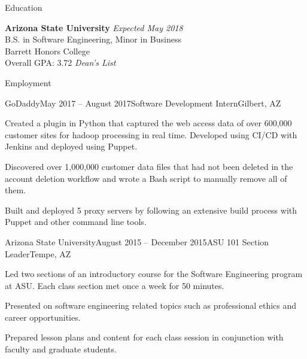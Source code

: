 \documentclass{resume} %
\begin{document}

\begin{rSection}{Education}

{\bf Arizona State University} \hfill {\em Expected May 2018} \\
B.S. in Software Engineering, Minor in Business \\
Barrett Honors College \smallskip \\
Overall GPA: 3.72 \textit{Dean's List}

\end{rSection}


\begin{rSection}{Employment}

\begin{rSubsection}{GoDaddy}{May 2017 -- August 2017}{Software Development Intern}{Gilbert, AZ}
\item Created a plugin in Python that captured the web access data of over 600,000 customer sites for hadoop processing in real time. Developed using CI/CD with Jenkins and deployed using Puppet.
\item Discovered over 1,000,000 customer data files that had not been deleted in the account deletion workflow and wrote a Bash script to manually remove all of them.
\item Built and deployed 5 proxy servers by following an extensive build process with Puppet and other command line tools.
\end{rSubsection}

\begin{rSubsection}{Arizona State University}{August 2015 -- December 2015}{ASU 101 Section Leader}{Tempe, AZ}
\item Led two sections of an introductory course for the Software Engineering program at ASU. Each class section met once a week for 50 minutes.
\item Presented on software engineering related topics such as professional ethics and career opportunities.
\item Prepared lesson plans and content for each class session in conjunction with faculty and graduate students.
\end{rSubsection}

\end{rSection}
\end{document}
